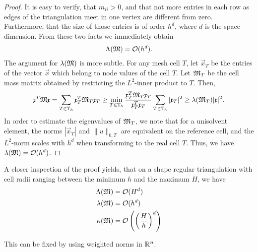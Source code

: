 \begin{proof}
  It is easy to verify, that $m_{ii}> 0$, and that not more
  entries in each row as edges of the triangulation meet in one vertex
  are different from zero. Furthermore, that the size of those entries
  is of order $h^d$, where $d$ is the space dimension. From these two
  facts we immediately obtain
  \begin{gather*}
    \Lambda(\mathfrak{M}) = \mathcal O(h^{d}).
  \end{gather*}
  The argument for $\lambda(\mathfrak{M})$ is more subtle. For any mesh cell
  $T$, let $\vec x_T$ be the entries of the vector $\vec x$ which
  belong to node values of the cell $T$. Let $\mathfrak{M}_T$ be the cell
  mass matrix obtained by restricting the $L^2$-inner product to
  $T$. Then,
  \begin{gather*}
    \mathfrak{x}^T \mathfrak{M} \mathfrak{x}
    = \sum_{T\in\mathbb T_h} \mathfrak{x}^T_T \mathfrak{M}_T \mathfrak{x}_T
    \ge \min_{T\in\mathbb T_h} \frac{\mathfrak{x}^T_T \mathfrak{M}_T \mathfrak{x}_T}{\mathfrak{x}^T_T\mathfrak{x}_T}
    \sum_{T\in\mathbb T_h} |\mathfrak{x}_T|^2 \ge \lambda(\mathfrak{M}_T)  |\mathfrak{x}|^2.
  \end{gather*}
  In order to estimate the eigenvalues of $\mathfrak{M}_T$, we note that for
  a unisolvent element, the norms $|\vec x_T|$ and $\|u\|_{0,T}$ are
  equivalent on the reference cell, and the $L^2$-norm scales with
  $h^d$ when transforming to the real cell $T$. Thus, we have
  $\lambda(\mathfrak{M}) = \mathcal O(h^{d})$.
\end{proof}

\begin{note}
  A closer inspection of the proof yields, that on a shape regular
  triangulation with cell radii ranging between the minimum $h$ and
  the maximum $H$, we have
  \begin{align*}
    \Lambda(\mathfrak{M}) &= \mathcal O(H^{d}) \\
    \lambda(\mathfrak{M}) &= \mathcal O(h^{d}) \\
    \kappa(\mathfrak{M}) &= \mathcal O\left(\left(\frac Hh\right)^{d}\right)
  \end{align*}
\end{note}

\begin{todo}
  This can be fixed by using weighted norms in $\mathbb R^n$.
\end{todo}

